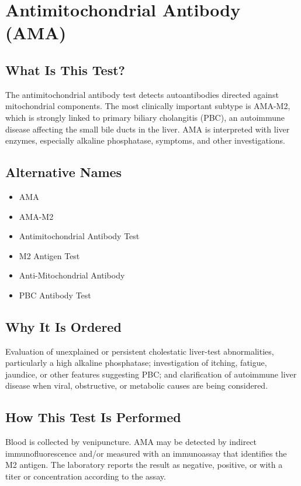 \chapter{Antimitochondrial Antibody (AMA)}

\section*{What Is This Test?}
The antimitochondrial antibody test detects autoantibodies directed against mitochondrial components. The most clinically important subtype is AMA-M2, which is strongly linked to primary biliary cholangitis (PBC), an autoimmune disease affecting the small bile ducts in the liver. AMA is interpreted with liver enzymes, especially alkaline phosphatase, symptoms, and other investigations.

\section*{Alternative Names}
\begin{itemize}
  \item AMA
  \item AMA-M2
  \item Antimitochondrial Antibody Test
  \item M2 Antigen Test
  \item Anti-Mitochondrial Antibody
  \item PBC Antibody Test
\end{itemize}
\section*{Why It Is Ordered}
Evaluation of unexplained or persistent cholestatic liver-test abnormalities, particularly a high alkaline phosphatase; investigation of itching, fatigue, jaundice, or other features suggesting PBC; and clarification of autoimmune liver disease when viral, obstructive, or metabolic causes are being considered.

\section*{How This Test Is Performed}
Blood is collected by venipuncture. AMA may be detected by indirect immunofluorescence and/or measured with an immunoassay that identifies the M2 antigen. The laboratory reports the result as negative, positive, or with a titer or concentration according to the assay.

